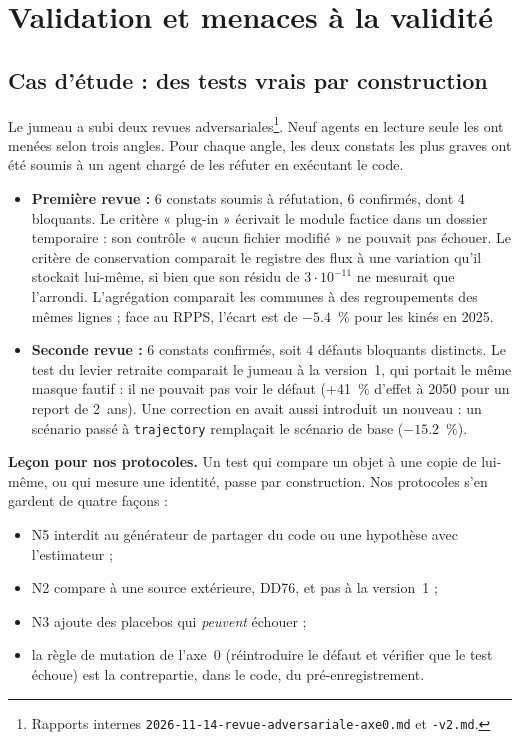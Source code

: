 \documentclass[11pt]{article}
\begin{document}
\section{Validation et menaces à la validité}\label{sec:menaces}
\subsection{Cas d'étude : des tests vrais par construction}
Le jumeau a subi deux revues adversariales\footnote{Rapports internes
\texttt{2026-11-14-revue-adversariale-axe0.md} et \texttt{-v2.md}.}. Neuf agents en lecture seule
les ont menées selon trois angles. Pour chaque angle, les deux constats les plus graves ont été
soumis à un agent chargé de les réfuter en exécutant le code.
\begin{itemize}
  \item \textbf{Première revue :} 6\mesure{} constats soumis à réfutation, 6 confirmés, dont
        4 bloquants. Le critère « plug-in » écrivait le module factice dans un dossier temporaire :
        son contrôle « aucun fichier modifié » ne pouvait pas échouer. Le critère de conservation
        comparait le registre des flux à une variation qu'il stockait lui-même, si bien que son
        résidu de $3 \cdot 10^{-11}$ ne mesurait que l'arrondi. L'agrégation comparait les communes
        à des regroupements des mêmes lignes ; face au RPPS, l'écart est de
        $-\num{5.4}$\mesure{}~\% pour les kinés en 2025.
  \item \textbf{Seconde revue :} 6\mesure{} constats confirmés, soit 4 défauts bloquants
        distincts. Le test du levier retraite comparait le jumeau à la version~1, qui portait le
        même masque fautif : il ne pouvait pas voir le défaut (+41\mesure{}~\% d'effet à 2050 pour un
        report de 2~ans). Une correction en avait aussi introduit un nouveau : un scénario passé à
        \texttt{trajectory} remplaçait le scénario de base ($-\num{15.2}$\mesure{}~\%).
\end{itemize}
\textbf{Leçon pour nos protocoles.} Un test qui compare un objet à une copie de lui-même, ou qui
mesure une identité, passe par construction. Nos protocoles s'en gardent de quatre façons :
\begin{itemize}
  \item N5 interdit au générateur de partager du code ou une hypothèse avec l'estimateur ;
  \item N2 compare à une source extérieure, DD76, et pas à la version~1 ;
  \item N3 ajoute des placebos qui \emph{peuvent} échouer ;
  \item la règle de mutation de l'axe~0 (réintroduire le défaut et vérifier que le test échoue)
        est la contrepartie, dans le code, du pré-enregistrement.
\end{itemize}
\end{document}
